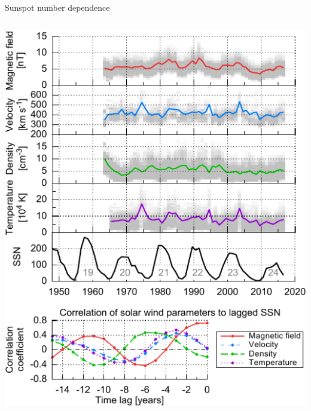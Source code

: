 \begin{frame}[c]{Sunspot number dependence}{}
	\begin{columns}[c]
		
		\includegraphics[width=\textwidth]{../figures_paper/OMNI_yearly_ssn_correlation_c_plot.pdf}


	\end{columns}
\end{frame}
